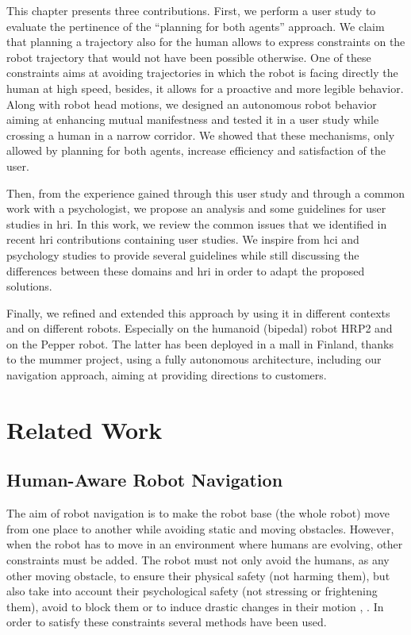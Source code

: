 \documentclass[a4paper,11pt,twoside]{StyleThese}
\begin{document}
\medskip

This chapter presents three contributions. First, we perform a user study to evaluate the pertinence of the ``planning for both agents'' approach. We claim that planning a trajectory also for the human allows to express constraints on the robot trajectory that would not have been possible otherwise. One of these constraints aims at avoiding trajectories in which the robot is facing directly the human at high speed, besides, it allows for a proactive and more legible behavior. Along with robot head motions, we designed an autonomous robot behavior aiming at enhancing mutual manifestness and tested it in a user study while crossing a human in a narrow corridor. We showed that these mechanisms, only allowed by planning for both agents, increase efficiency and satisfaction of the user.

Then, from the experience gained through this user study and through a common work with a psychologist, we propose an analysis and some guidelines for user studies in \acrshort{hri}. In this work, we review the common issues that we identified in recent \acrshort{hri} contributions containing user studies. We inspire from \acrlong{hci} and psychology studies to provide several guidelines while still discussing the differences between these domains and \acrshort{hri} in order to adapt the proposed solutions.

Finally, we refined and extended this approach by using it in different contexts and on different robots. Especially on the humanoid (bipedal) robot HRP2 and on the Pepper robot. The latter has been deployed in a mall in Finland, thanks to the \acrshort{mummer} project, using a fully autonomous architecture, including our navigation approach, aiming at providing directions to customers.

\section{Related Work}
\subsection{Human-Aware Robot Navigation}
The aim of robot navigation is to make the robot base (the whole robot) move from one place to another while avoiding static and moving obstacles. However, when the robot has to move in an environment where humans are evolving, other constraints must be added. The robot must not only avoid the humans, as any other moving obstacle, to ensure their physical safety (not harming them), but also take into account their psychological safety (not stressing or frightening them), avoid to block them or to induce drastic changes in their motion \cite{sisbot_human_2007}, \cite{kruse_human-aware_2013}. In order to satisfy these constraints several methods have been used.
\end{document}
